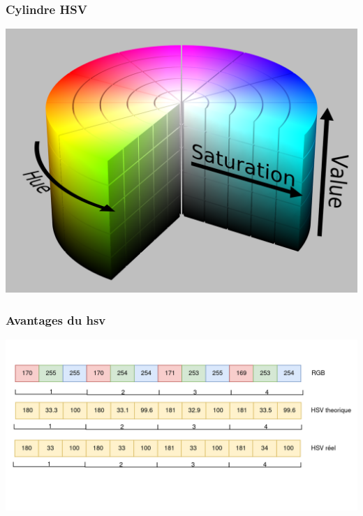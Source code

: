 \documentclass{beamer}
\begin{document}
    \begin{frame}
        \frametitle{Cylindre HSV}
        \includegraphics[width=\linewidth]{img/fig10.png}
    \end{frame}    
    
    \begin{frame}
        \frametitle{Avantages du hsv}
        \includegraphics[width=\linewidth]{img/fig11.png}
    \end{frame}
\end{document}
